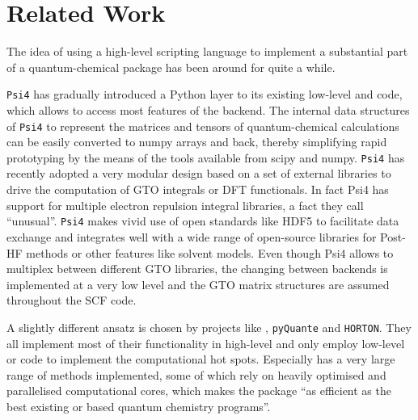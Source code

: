 \section{Related Work}
\newcommand{\psifour}{\texttt{Psi4}\xspace}
\newcommand{\pyquante}{\texttt{pyQuante}\xspace}
\newcommand{\horton}{\texttt{HORTON}\xspace}
\newcommand{\gpaw}{\texttt{GPAW}\xspace}

\label{sec:related}




The idea of using a high-level scripting language to implement
a substantial part of a quantum-chemical package has been around
for quite a while.

\psifour\cite{Parrish2017} has gradually introduced a Python layer to its existing
low-level \cpp and \cee code, which allows to access most features of the backend.
The internal data structures of \psifour to represent the matrices and tensors
of quantum-chemical calculations can be easily converted to numpy arrays and back,
thereby simplifying rapid prototyping by the means of the tools available
from scipy and numpy.
\psifour has recently adopted a very modular design based on a set of external
libraries to drive the computation of GTO integrals or DFT functionals.
In fact Psi4 has support for multiple electron repulsion integral libraries,
a fact they call ``unusual''.
\psifour makes vivid use of open standards like HDF5 to facilitate data exchange
and integrates well with a wide range of open-source libraries for Post-HF
methods or other features like solvent models.
Even though Psi4 allows to multiplex between different GTO libraries,
the changing between backends is implemented at a very low level
and the GTO matrix structures are assumed throughout \eg the SCF code.

A slightly different ansatz is chosen by projects like
\pyscf\cite{Sun2017}, \pyquante{} and \horton\cite{Verstraelen2017}.
They all implement most of their functionality in high-level
\python and only employ low-level \cpp or \cee code to implement the computational
hot spots.
Especially \pyscf has a very large range of methods implemented, some of which
rely on heavily optimised and parallelised computational cores, which makes the
package ``as efficient as the best existing \cee or \fortran based quantum
chemistry programs''\cite{Sun2017}.

